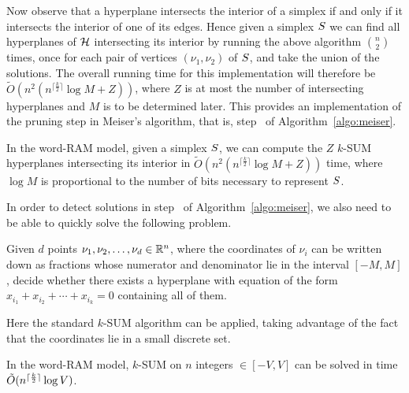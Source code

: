 Now observe that a hyperplane intersects the interior of a simplex if and only
if it intersects the interior of one of its edges. Hence given a simplex
$S$ we can find all hyperplanes of $\mathcal{H}$ intersecting its interior by
running the above algorithm ${n\choose 2}$ times, once for each pair of
vertices $(\nu_1,\nu_2)$ of $S$, and take the union of the solutions.
The overall running time for this implementation will therefore be
$\tilde{O}(n^2 (n^{\lceil \frac k2 \rceil} \log M + Z))$, where $Z$ is at most the
number of intersecting hyperplanes and $M$ is to be determined later.
This provides an implementation of the pruning step in Meiser's algorithm, that
is, step~ of Algorithm~\ref{algo:meiser}.

\begin{corollary}\label{cor:double}
	In the word-RAM model,
	given a simplex $S$, we can compute the \(Z\) $k$-SUM hyperplanes
	intersecting its interior in $\tilde{O}(n^2 (n^{\lceil \frac k2 \rceil}
	\log M + Z))$ time, where $\log M$ is proportional to the number of bits
	necessary to represent $S$.
\end{corollary}

In order to detect solutions in step~ of Algorithm~\ref{algo:meiser}, we also
need to be able to quickly solve the following problem.
\begin{problem}
	Given $d$ points $\nu_1,\nu_2,\ldots,\nu_d \in \mathbb{R}^n$, where the coordinates of
	$\nu_i$ can be written down as fractions whose numerator and denominator
	lie in the interval $[-M,M]$,
	decide whether there exists a hyperplane with equation of the form $x_{i_1}
	+ x_{i_2} + \cdots + x_{i_k} = 0$ containing all of them.
\end{problem}

Here the standard $k$-SUM algorithm can be applied, taking advantage of
the fact that the coordinates lie in a small discrete set.
\begin{lemma}\label{lem:ksum}
	In the word-RAM model,
	$k$-SUM on $n$ integers $\in [-V,V]$ can be solved in time
	$\tilde{O}(n^{{\lceil\frac{k}{2} \rceil}}\log V)$.
\end{lemma}

